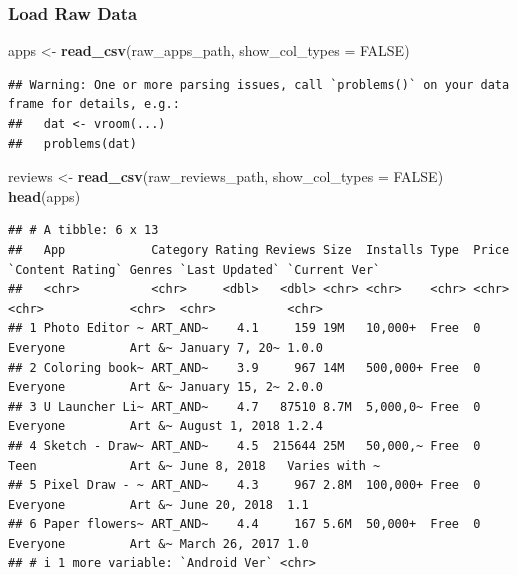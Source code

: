\documentclass[
]{article}
\newenvironment{Shaded}{\begin{snugshade}}{\end{snugshade}}
\newcommand{\AttributeTok}[1]{\textcolor[rgb]{0.13,0.29,0.53}{#1}}
\newcommand{\ConstantTok}[1]{\textcolor[rgb]{0.56,0.35,0.01}{#1}}
\newcommand{\FunctionTok}[1]{\textcolor[rgb]{0.13,0.29,0.53}{\textbf{#1}}}
\newcommand{\NormalTok}[1]{#1}
\newcommand{\OtherTok}[1]{\textcolor[rgb]{0.56,0.35,0.01}{#1}}
\begin{document}
\subsubsection{Load Raw Data}\label{load-raw-data}

\begin{Shaded}
\begin{Highlighting}[]
\NormalTok{apps }\OtherTok{\textless{}{-}} \FunctionTok{read\_csv}\NormalTok{(raw\_apps\_path, }\AttributeTok{show\_col\_types =} \ConstantTok{FALSE}\NormalTok{)}
\end{Highlighting}
\end{Shaded}

\begin{verbatim}
## Warning: One or more parsing issues, call `problems()` on your data frame for details, e.g.:
##   dat <- vroom(...)
##   problems(dat)
\end{verbatim}

\begin{Shaded}
\begin{Highlighting}[]
\NormalTok{reviews }\OtherTok{\textless{}{-}} \FunctionTok{read\_csv}\NormalTok{(raw\_reviews\_path, }\AttributeTok{show\_col\_types =} \ConstantTok{FALSE}\NormalTok{)}
\FunctionTok{head}\NormalTok{(apps)}
\end{Highlighting}
\end{Shaded}

\begin{verbatim}
## # A tibble: 6 x 13
##   App            Category Rating Reviews Size  Installs Type  Price `Content Rating` Genres `Last Updated` `Current Ver`
##   <chr>          <chr>     <dbl>   <dbl> <chr> <chr>    <chr> <chr> <chr>            <chr>  <chr>          <chr>        
## 1 Photo Editor ~ ART_AND~    4.1     159 19M   10,000+  Free  0     Everyone         Art &~ January 7, 20~ 1.0.0        
## 2 Coloring book~ ART_AND~    3.9     967 14M   500,000+ Free  0     Everyone         Art &~ January 15, 2~ 2.0.0        
## 3 U Launcher Li~ ART_AND~    4.7   87510 8.7M  5,000,0~ Free  0     Everyone         Art &~ August 1, 2018 1.2.4        
## 4 Sketch - Draw~ ART_AND~    4.5  215644 25M   50,000,~ Free  0     Teen             Art &~ June 8, 2018   Varies with ~
## 5 Pixel Draw - ~ ART_AND~    4.3     967 2.8M  100,000+ Free  0     Everyone         Art &~ June 20, 2018  1.1          
## 6 Paper flowers~ ART_AND~    4.4     167 5.6M  50,000+  Free  0     Everyone         Art &~ March 26, 2017 1.0          
## # i 1 more variable: `Android Ver` <chr>
\end{verbatim}
\end{document}
